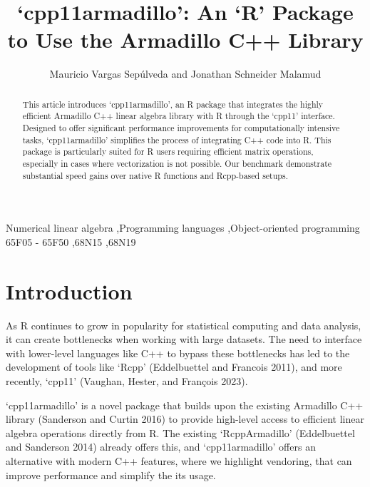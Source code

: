 \documentclass[preprint,12pt]{elsarticle}
\begin{document}
\begin{frontmatter}

\title{`cpp11armadillo': An `R' Package to Use the Armadillo C++
Library}

\author{Mauricio Vargas Sepúlveda and Jonathan Schneider Malamud}


\begin{abstract}
This article introduces `cpp11armadillo', an R package that integrates
the highly efficient Armadillo C++ linear algebra library with R through
the `cpp11' interface. Designed to offer significant performance
improvements for computationally intensive tasks, `cpp11armadillo'
simplifies the process of integrating C++ code into R. This package is
particularly suited for R users requiring efficient matrix operations,
especially in cases where vectorization is not possible. Our benchmark
demonstrate substantial speed gains over native R functions and
Rcpp-based setups.
\end{abstract}

\begin{keyword}
Numerical linear algebra \sep Programming languages \sep Object-oriented programming
\MSC[2024] 65F05 - 65F50 \sep 68N15 \sep 68N19
\end{keyword}

\end{frontmatter}

\section{Introduction}\label{introduction}

As R continues to grow in popularity for statistical computing and data
analysis, it can create bottlenecks when working with large datasets.
The need to interface with lower-level languages like C++ to bypass
these bottlenecks has led to the development of tools like `Rcpp'
(Eddelbuettel and Francois 2011), and more recently, `cpp11' (Vaughan,
Hester, and François 2023).

`cpp11armadillo' is a novel package that builds upon the existing
Armadillo C++ library (Sanderson and Curtin 2016) to provide high-level
access to efficient linear algebra operations directly from R. The
existing `RcppArmadillo' (Eddelbuettel and Sanderson 2014) already
offers this, and `cpp11armadillo' offers an alternative with modern C++
features, where we highlight vendoring, that can improve performance and
simplify the its usage.
\end{document}
